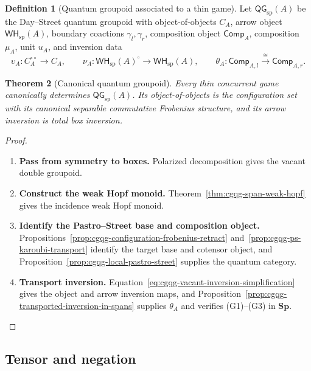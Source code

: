 \documentclass[oneside]{article}
\newcommand{\WH}{\mathsf{WH}}
\newcommand{\QG}{\mathsf{QG}}
\newcommand{\Sp}{\mathbf{Sp}}
\theoremstyle{plain}
\newtheorem{theorem}{Theorem}[section]
\theoremstyle{definition}
\newtheorem{definition}[theorem]{Definition}
\theoremstyle{remark}
\begin{document}
\begin{definition}[Quantum groupoid associated to a thin game]
\label{def:cgqg-game-quantum-groupoid}
    Let \(\QG_{\mathrm{sp}}(A)\) be the Day--Street quantum groupoid with object-of-objects \(C_A\), arrow object \(\WH_{\mathrm{sp}}(A)\), boundary coactions \(\gamma_l,\gamma_r\), composition object \(\mathsf{Comp}_A\), composition \(\mu_A\), unit \(u_A\), and inversion data
    \[
        \upsilon_A: C_A^{\circ\circ}\to C_A,
        \qquad
        \nu_A:\WH_{\mathrm{sp}}(A)^\circ\to\WH_{\mathrm{sp}}(A),
        \qquad
        \theta_A:\mathsf{Comp}_{A,l}\xrightarrow{\cong}\mathsf{Comp}_{A,r}.
    \]
\end{definition}

\begin{theorem}[Canonical quantum groupoid]
\label{thm:cgqg-game-qg}
    Every thin concurrent game canonically determines \(\QG_{\mathrm{sp}}(A)\). Its object-of-objects is the configuration set with its canonical separable commutative Frobenius structure, and its arrow inversion is total box inversion.
\end{theorem}
\begin{proof}
    \leavevmode
    \begin{enumerate}[beginpenalty=10000]
        \item \textbf{Pass from symmetry to boxes.} Polarized decomposition gives the vacant double groupoid.
  
        \item \textbf{Construct the weak Hopf monoid.} Theorem~\ref{thm:cgqg-span-weak-hopf} gives the incidence weak Hopf monoid.
  
        \item \textbf{Identify the Pastro--Street base and composition object.} Propositions~\ref{prop:cgqg-configuration-frobenius-retract} and~\ref{prop:cgqg-ps-karoubi-transport} identify the target base and cotensor object, and Proposition~\ref{prop:cgqg-local-pastro-street} supplies the quantum category.
  
        \item \textbf{Transport inversion.} Equation~\eqref{eq:cgqg-vacant-inversion-simplification} gives the object and arrow inversion maps, and Proposition~\ref{prop:cgqg-transported-inversion-in-spans} supplies \(\theta_A\) and verifies \textup{(G1)--(G3)} in \(\Sp\). \qedhere
    \end{enumerate}
\end{proof}

\subsection{Tensor and negation}
\end{document}
